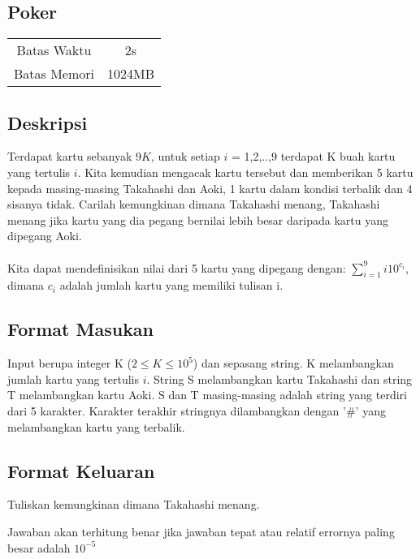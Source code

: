 \documentclass{article}
\begin{document}
\begin{center}

    
    \section*{Poker} %

    \begin{tabular}{ | c c | }
        \hline
        Batas Waktu  & 2s \\    %
        Batas Memori & 1024MB \\  %
        \hline
    \end{tabular}
\end{center}

\subsection*{Deskripsi}
Terdapat kartu sebanyak 9$K$, untuk setiap $i$ = 1,2,..,9 terdapat K buah kartu yang tertulis $i$. Kita kemudian mengacak kartu tersebut dan memberikan 5 kartu kepada masing-masing Takahashi dan Aoki, 1 kartu dalam kondisi terbalik dan 4 sisanya tidak. Carilah kemungkinan dimana Takahashi menang, Takahashi menang jika kartu yang dia pegang bernilai lebih besar daripada kartu yang dipegang Aoki.
\\
\\
Kita dapat mendefinisikan nilai dari 5 kartu yang dipegang dengan:
$\displaystyle\sum_{i=1}^9i10^{c_i}$, dimana $c_i$ adalah jumlah kartu yang memiliki tulisan i.
\subsection*{Format Masukan}
Input berupa integer K ($2 \leq K \leq 10^5$) dan sepasang string. K melambangkan jumlah kartu yang tertulis $i$. String S melambangkan kartu Takahashi dan string T melambangkan kartu Aoki. S dan T masing-masing adalah string yang terdiri dari 5 karakter. Karakter terakhir stringnya dilambangkan dengan '#' yang melambangkan kartu yang terbalik.

\subsection*{Format Keluaran}
Tuliskan kemungkinan dimana Takahashi menang.

Jawaban akan terhitung benar jika jawaban tepat atau relatif errornya paling besar adalah $10^{-5}$
\\
\end{document}
